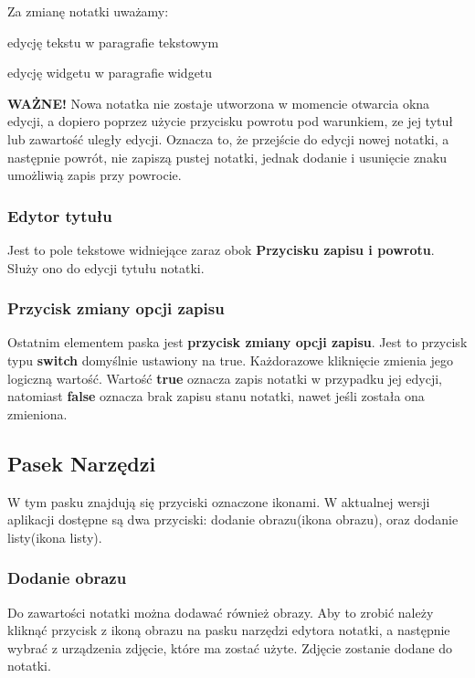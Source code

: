 Za zmianę notatki uważamy:

\begin{compactitem}
    \item edycję tekstu w paragrafie tekstowym
    \item edycję widgetu w paragrafie widgetu
\end{compactitem}
\vspace{5mm}

\textbf{WAŻNE!} Nowa notatka nie zostaje utworzona w momencie otwarcia okna edycji, a dopiero poprzez użycie przycisku powrotu pod warunkiem, ze jej tytuł lub zawartość uległy edycji. Oznacza to, że przejście do edycji nowej notatki, a następnie powrót, nie zapiszą pustej notatki, jednak dodanie i usunięcie znaku umożliwią zapis przy powrocie.

\subsubsection{Edytor tytułu}

Jest to pole tekstowe widniejące zaraz obok \textbf{Przycisku zapisu i powrotu}. Służy ono do edycji tytułu notatki.

\subsubsection{Przycisk zmiany opcji zapisu}

Ostatnim elementem paska jest \textbf{przycisk zmiany opcji zapisu}. Jest to przycisk typu \textbf{switch} domyślnie ustawiony na true. Każdorazowe kliknięcie zmienia jego logiczną wartość.
Wartość \textbf{true} oznacza zapis notatki w przypadku jej edycji, natomiast \textbf{false} oznacza brak zapisu stanu notatki, nawet jeśli została ona zmieniona.

\subsection{Pasek Narzędzi}

W tym pasku znajdują się przyciski oznaczone ikonami.
W aktualnej wersji aplikacji dostępne są dwa przyciski: dodanie obrazu(ikona obrazu), oraz dodanie listy(ikona listy).

\subsubsection{Dodanie obrazu}

Do zawartości notatki można dodawać również obrazy. Aby to zrobić należy kliknąć przycisk z ikoną obrazu na pasku narzędzi edytora notatki, a następnie wybrać z urządzenia zdjęcie, które ma zostać użyte. Zdjęcie zostanie dodane do notatki.

